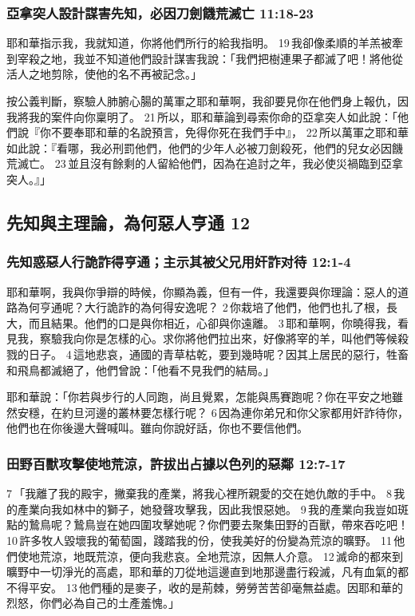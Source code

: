 \subsubsection{亞拿突人設計謀害先知，必因刀劍饑荒滅亡 11:18-23}
耶和華指示我，我就知道，你將他們所行的給我指明。 19 我卻像柔順的羊羔被牽到宰殺之地，我並不知道他們設計謀害我說：「我們把樹連果子都滅了吧！將他從活人之地剪除，使他的名不再被記念。」

按公義判斷，察驗人肺腑心腸的萬軍之耶和華啊，我卻要見你在他們身上報仇，因我將我的案件向你稟明了。 21 所以，耶和華論到尋索你命的亞拿突人如此說：「他們說『你不要奉耶和華的名說預言，免得你死在我們手中』， 22 所以萬軍之耶和華如此說：『看哪，我必刑罰他們，他們的少年人必被刀劍殺死，他們的兒女必因饑荒滅亡。 23 並且沒有餘剩的人留給他們，因為在追討之年，我必使災禍臨到亞拿突人。』」



\subsection{先知與主理論，為何惡人亨通  12}
\subsubsection{先知惑惡人行詭詐得亨通；主示其被父兄用奸詐对待 12:1-4}
耶和華啊，我與你爭辯的時候，你顯為義，但有一件，我還要與你理論：惡人的道路為何亨通呢？大行詭詐的為何得安逸呢？ 2 你栽培了他們，他們也扎了根，長大，而且結果。他們的口是與你相近，心卻與你遠離。 3 耶和華啊，你曉得我，看見我，察驗我向你是怎樣的心。求你將他們拉出來，好像將宰的羊，叫他們等候殺戮的日子。 4 這地悲哀，通國的青草枯乾，要到幾時呢？因其上居民的惡行，牲畜和飛鳥都滅絕了，他們曾說：「他看不見我們的結局。」

耶和華說：「你若與步行的人同跑，尚且覺累，怎能與馬賽跑呢？你在平安之地雖然安穩，在約旦河邊的叢林要怎樣行呢？ 6 因為連你弟兄和你父家都用奸詐待你，他們也在你後邊大聲喊叫。雖向你說好話，你也不要信他們。

\subsubsection{田野百獸攻擊使地荒涼，許拔出占據以色列的惡鄰 12:7-17}
7 「我離了我的殿宇，撇棄我的產業，將我心裡所親愛的交在她仇敵的手中。 8 我的產業向我如林中的獅子，她發聲攻擊我，因此我恨惡她。 9 我的產業向我豈如斑點的鷙鳥呢？鷙鳥豈在她四圍攻擊她呢？你們要去聚集田野的百獸，帶來吞吃吧！ 10 許多牧人毀壞我的葡萄園，踐踏我的份，使我美好的份變為荒涼的曠野。 11 他們使地荒涼，地既荒涼，便向我悲哀。全地荒涼，因無人介意。 12 滅命的都來到曠野中一切淨光的高處，耶和華的刀從地這邊直到地那邊盡行殺滅，凡有血氣的都不得平安。 13 他們種的是麥子，收的是荊棘，勞勞苦苦卻毫無益處。因耶和華的烈怒，你們必為自己的土產羞愧。」

